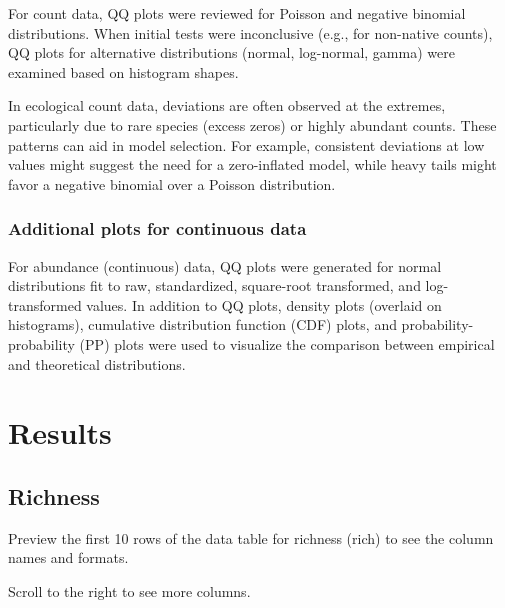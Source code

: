 \documentclass[
  letterpaper,
  DIV=11,
  numbers=noendperiod]{scrartcl}
\begin{document}
For count data, QQ plots were reviewed for Poisson and negative binomial
distributions. When initial tests were inconclusive (e.g., for
non-native counts), QQ plots for alternative distributions (normal,
log-normal, gamma) were examined based on histogram shapes.

In ecological count data, deviations are often observed at the extremes,
particularly due to rare species (excess zeros) or highly abundant
counts. These patterns can aid in model selection. For example,
consistent deviations at low values might suggest the need for a
zero-inflated model, while heavy tails might favor a negative binomial
over a Poisson distribution.

\subsubsection{Additional plots for continuous
data}\label{additional-plots-for-continuous-data}

For abundance (continuous) data, QQ plots were generated for normal
distributions fit to raw, standardized, square-root transformed, and
log-transformed values. In addition to QQ plots, density plots (overlaid
on histograms), cumulative distribution function (CDF) plots, and
probability-probability (PP) plots were used to visualize the comparison
between empirical and theoretical distributions.

\section{Results}\label{results}

\subsection{Richness}\label{richness}

Preview the first 10 rows of the data table for richness (rich) to see
the column names and formats.

\begin{tcolorbox}[enhanced jigsaw, rightrule=.15mm, breakable, colbacktitle=quarto-callout-tip-color!10!white, left=2mm, colframe=quarto-callout-tip-color-frame, coltitle=black, opacitybacktitle=0.6, colback=white, toprule=.15mm, titlerule=0mm, opacityback=0, leftrule=.75mm, bottomtitle=1mm, toptitle=1mm, title=\textcolor{quarto-callout-tip-color}{\faLightbulb}\hspace{0.5em}{Tip}, arc=.35mm, bottomrule=.15mm]

Scroll to the right to see more columns.

\end{tcolorbox}
\end{document}

